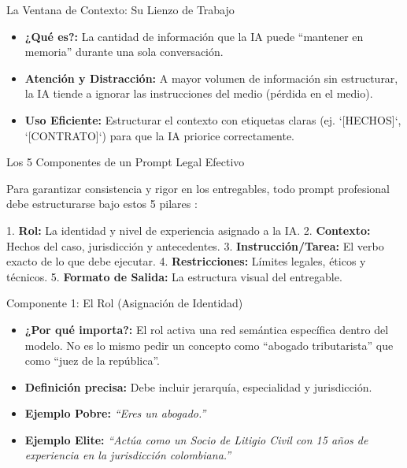 \documentclass[aspectratio=169]{beamer}
\begin{document}
\begin{frame}[fragile]{La Ventana de Contexto: Su Lienzo de Trabajo}


\begin{itemize}
  \item \textbf{¿Qué es?:} La cantidad de información que la IA puede ``mantener en memoria'' durante una sola conversación.
  \item \textbf{Atención y Distracción:} A mayor volumen de información sin estructurar, la IA tiende a ignorar las instrucciones del medio (pérdida en el medio).
  \item \textbf{Uso Eficiente:} Estructurar el contexto con etiquetas claras (ej. `[HECHOS]`, `[CONTRATO]`) para que la IA priorice correctamente.
\end{itemize}
\end{frame}



\begin{frame}[fragile]{Los 5 Componentes de un Prompt Legal Efectivo}


Para garantizar consistencia y rigor en los entregables, todo prompt profesional debe estructurarse bajo estos 5 pilares \cite{sal2024}:

1. \textbf{Rol:} La identidad y nivel de experiencia asignado a la IA.
2. \textbf{Contexto:} Hechos del caso, jurisdicción y antecedentes.
3. \textbf{Instrucción/Tarea:} El verbo exacto de lo que debe ejecutar.
4. \textbf{Restricciones:} Límites legales, éticos y técnicos.
5. \textbf{Formato de Salida:} La estructura visual del entregable.


\end{frame}



\begin{frame}[fragile]{Componente 1: El Rol (Asignación de Identidad)}


\begin{itemize}
  \item \textbf{¿Por qué importa?:} El rol activa una red semántica específica dentro del modelo. No es lo mismo pedir un concepto como ``abogado tributarista'' que como ``juez de la república''.
  \item \textbf{Definición precisa:} Debe incluir jerarquía, especialidad y jurisdicción.
  \item \textbf{Ejemplo Pobre:} \textit{``Eres un abogado.''}
  \item \textbf{Ejemplo Elite:} \textit{``Actúa como un Socio de Litigio Civil con 15 años de experiencia en la jurisdicción colombiana.''}
\end{itemize}
\end{frame}
\end{document}
